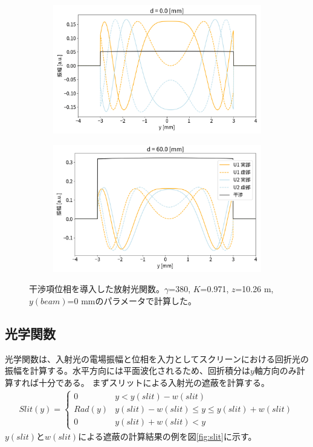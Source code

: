 \documentclass[a4paper,11pt,uplatex]{jsbook}
\begin{document}
\begin{figure}[H]
  \begin{subfigure}[h]{0.45\linewidth}
    \centering
    \includegraphics[width=\linewidth]{image/2-int-d00png.png}
  \end{subfigure}
  \begin{subfigure}[h]{0.45\linewidth}
    \centering
    \includegraphics[width=\linewidth]{image/2-int-d60.png}
  \end{subfigure}
  \caption[放射光関数の干渉項位相]{干渉項位相を導入した放射光関数。$\gamma$=380, $K$=0.971, $z$=10.26 m, $y(beam)$=0 mmのパラメータで計算した。}
  \label{fig:int}
\end{figure}

\subsection{光学関数}
光学関数は、入射光の電場振幅と位相を入力としてスクリーンにおける回折光の振幅を計算する。水平方向には平面波化されるため、回折積分は$y$軸方向のみ計算すれば十分である。
まずスリットによる入射光の遮蔽を計算する。
\begin{align}
  Slit(y) = 
  \begin{cases}
    0       &  y  < y(slit) - w(slit)\\
    Rad(y)  &  y(slit) - w(slit) \leq y \leq y(slit) + w(slit)\\
    0       &  y(slit) + w(slit) < y
  \end{cases}
\end{align}
$y(slit)$と$w(slit)$による遮蔽の計算結果の例を図\ref{fig:slit}に示す。
\end{document}
